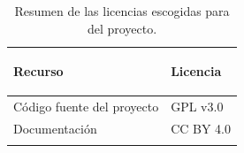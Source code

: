 \begin{longtable}[]{@{}ll@{}}
\toprule \label{resumelicense}
\begin{minipage}[b]{0.50\columnwidth}\raggedright\strut
Recurso\strut
\end{minipage} & \begin{minipage}[b]{0.21\columnwidth}\raggedright\strut
Licencia\strut
\end{minipage}\tabularnewline
\midrule
\endhead
\begin{minipage}[t]{0.50\columnwidth}\raggedright\strut
Código fuente del proyecto\strut
\end{minipage} & \begin{minipage}[t]{0.21\columnwidth}\raggedright\strut
GPL v3.0\strut
\end{minipage}\tabularnewline
\begin{minipage}[t]{0.50\columnwidth}\raggedright\strut
Documentación\strut
\end{minipage} & \begin{minipage}[t]{0.21\columnwidth}\raggedright\strut
CC BY 4.0\strut
\end{minipage}\tabularnewline
\bottomrule
\caption{Resumen de las licencias escogidas para del proyecto.}
\end{longtable}